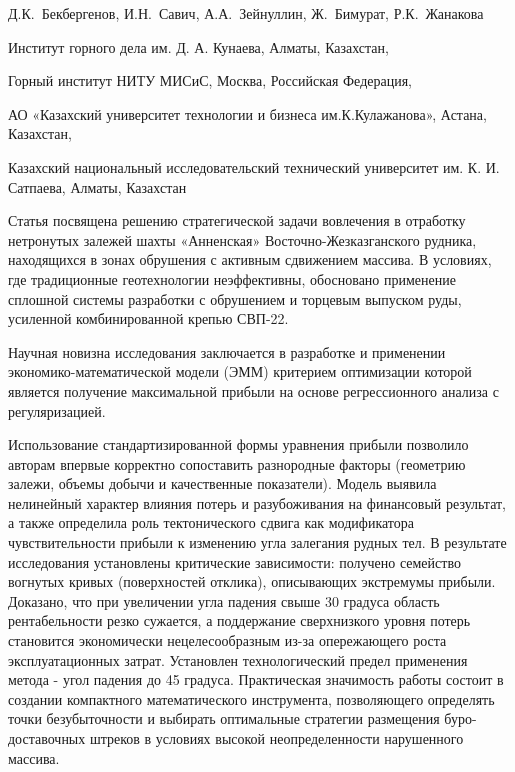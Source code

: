 \vspace{1em}
\begin{header}

Д.К.~Бекбергенов\envelope,
И.Н.~Савич,
А.А.~Зейнуллин,
Ж.~Бимурат,
Р.К.~Жанакова\envelope
\end{header}

\begin{affil}
Институт горного дела им. Д. А. Кунаева, Алматы, Казахстан,

Горный институт НИТУ МИСиС, Москва, Российская Федерация,

АО «Казахский университет технологии и бизнеса им.К.Кулажанова», Астана, Казахстан,

Казахский национальный исследовательский технический университет им. К. И. Сатпаева, Алматы, Казахстан

\end{affil}

Статья посвящена решению стратегической задачи вовлечения в отработку
нетронутых залежей шахты «Анненская» Восточно-Жезказганского рудника,
находящихся в зонах обрушения с активным сдвижением массива. В условиях,
где традиционные геотехнологии неэффективны, обосновано применение
сплошной системы разработки с обрушением и торцевым выпуском руды,
усиленной комбинированной крепью СВП-22.

Научная новизна исследования заключается в разработке и применении
экономико-математи\-ческой модели (ЭММ) критерием оптимизации которой
является получение максимальной прибыли на основе регрессионного анализа
с регуляризацией.

Использование стандартизированной формы уравнения прибыли позволило
авторам впервые корректно сопоставить разнородные факторы (геометрию
залежи, объемы добычи и качественные показатели). Модель выявила
нелинейный характер влияния потерь и разубоживания на финансовый
результат, а также определила роль тектонического сдвига как
модификатора чувствительности прибыли к изменению угла залегания рудных
тел. В результате исследования установлены критические зависимости:
получено семейство вогнутых кривых (поверхностей отклика), описывающих
экстремумы прибыли. Доказано, что при увеличении угла падения свыше 30
градуса область рентабельности резко сужается, а поддержание
сверхнизкого уровня потерь становится экономически нецелесообразным
из-за опережающего роста эксплуатационных затрат. Установлен
технологический предел применения метода - угол падения до 45 градуса.
Практическая значимость работы состоит в создании компактного
математического инструмента, позволяющего определять точки
безубыточности и выбирать оптимальные стратегии размещения
буро-доставочных штреков в условиях высокой неопределенности нарушенного
массива.

